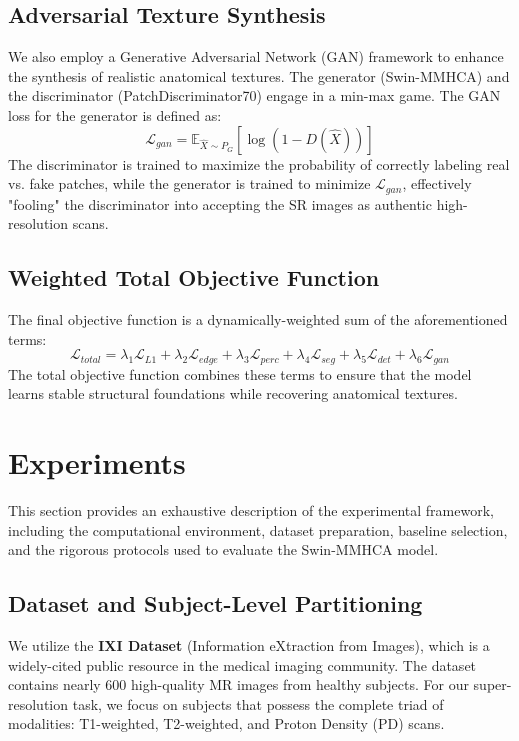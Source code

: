 \documentclass{IEEEoj}
\begin{document}
\subsection{Adversarial Texture Synthesis}
We also employ a Generative Adversarial Network (GAN) framework to enhance the synthesis of realistic anatomical textures. The generator (Swin-MMHCA) and the discriminator (PatchDiscriminator70) engage in a min-max game. The GAN loss for the generator is defined as:
\begin{equation}
    \mathcal{L}_{gan} = \mathbb{E}_{\hat{X} \sim P_G} [\log(1 - D(\hat{X}))]
\end{equation}
The discriminator is trained to maximize the probability of correctly labeling real vs. fake patches, while the generator is trained to minimize $\mathcal{L}_{gan}$, effectively "fooling" the discriminator into accepting the SR images as authentic high-resolution scans.

\subsection{Weighted Total Objective Function}
The final objective function is a dynamically-weighted sum of the aforementioned terms:
\begin{equation}
    \mathcal{L}_{total} = \lambda_1 \mathcal{L}_{L1} + \lambda_2 \mathcal{L}_{edge} + \lambda_3 \mathcal{L}_{perc} + \lambda_4 \mathcal{L}_{seg} + \lambda_5 \mathcal{L}_{det} + \lambda_6 \mathcal{L}_{gan}
\end{equation}
The total objective function combines these terms to ensure that the model learns stable structural foundations while recovering anatomical textures.

\section{Experiments}
This section provides an exhaustive description of the experimental framework, including the computational environment, dataset preparation, baseline selection, and the rigorous protocols used to evaluate the Swin-MMHCA model.

\subsection{Dataset and Subject-Level Partitioning}
We utilize the \textbf{IXI Dataset} \cite{ixi_dataset} (Information eXtraction from Images), which is a widely-cited public resource in the medical imaging community. The dataset contains nearly 600 high-quality MR images from healthy subjects. For our super-resolution task, we focus on subjects that possess the complete triad of modalities: T1-weighted, T2-weighted, and Proton Density (PD) scans.
\end{document}
